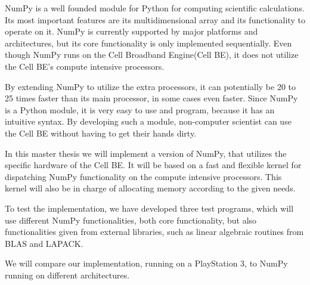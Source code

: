 NumPy is a well founded module for Python for computing scientific
calculations. Its most important features are its multidimensional
array and its functionality to operate on it. NumPy is currently
supported by major platforms and architectures, but its core
functionality is only implemented sequentially. Even though NumPy runs
on the Cell Broadband Engine(Cell BE), it does not utilize the Cell
BE's compute intensive processors.

By extending NumPy to utilize the extra processors, it can potentially
be 20 to 25 times faster than its main processor, in some cases even
faster. Since NumPy is a Python module, it is very easy to use and
program, because it has an intuitive syntax. By developing such a
module, non-computer scientist can use the Cell BE without having to
get their hands dirty.

In this master thesis we will implement a version of NumPy, that
utilizes the specific hardware of the Cell BE. It will be based on a
fast and flexible kernel for dispatching NumPy functionality on the
compute intensive processors. This kernel will also be in charge of
allocating memory according to the given needs.

To test the implementation, we have developed three test programs,
which will use different NumPy functionalities, both core
functionality, but also functionalities given from external libraries,
such as linear algebraic routines from BLAS and LAPACK.

We will compare our implementation, running on a PlayStation 3, to
NumPy running on different architectures.
